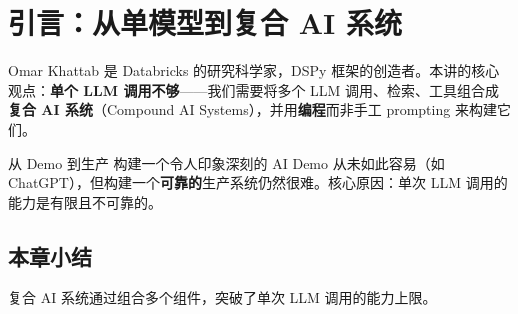 \section{引言：从单模型到复合 AI 系统}

Omar Khattab 是 Databricks 的研究科学家，DSPy 框架的创造者。本讲的核心观点：\textbf{单个 LLM 调用不够}——我们需要将多个 LLM 调用、检索、工具组合成\textbf{复合 AI 系统}（Compound AI Systems），并用\textbf{编程}而非手工 prompting 来构建它们。

\begin{importantbox}{从 Demo 到生产}
构建一个令人印象深刻的 AI Demo 从未如此容易（如 ChatGPT），但构建一个\textbf{可靠的}生产系统仍然很难。核心原因：单次 LLM 调用的能力是有限且不可靠的。
\end{importantbox}

\subsection{本章小结}

复合 AI 系统通过组合多个组件，突破了单次 LLM 调用的能力上限。

